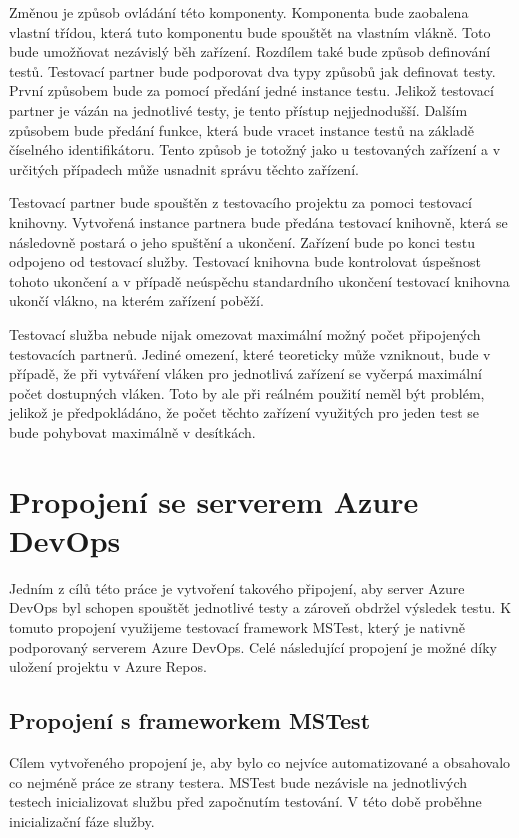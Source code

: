 Změnou je způsob ovládání této komponenty. Komponenta bude zaobalena vlastní třídou, která tuto komponentu bude spouštět na vlastním vlákně. Toto bude umožňovat nezávislý běh zařízení. Rozdílem také bude způsob definování testů. Testovací partner bude podporovat dva typy způsobů jak definovat testy. První způsobem bude za pomocí předání jedné instance testu. Jelikož testovací partner je vázán na jednotlivé testy, je tento přístup nejjednodušší. Dalším způsobem bude předání funkce, která bude vracet instance testů na základě číselného identifikátoru. Tento způsob je totožný jako u testovaných zařízení a v určitých případech může usnadnit správu těchto zařízení. 

Testovací partner bude spouštěn z testovacího projektu za pomoci testovací knihovny. Vytvořená instance partnera bude předána testovací knihovně, která se následovně postará o jeho spuštění a ukončení. Zařízení bude po konci testu odpojeno od testovací služby. Testovací knihovna bude kontrolovat úspešnost tohoto ukončení a v případě neúspěchu standardního ukončení testovací knihovna ukončí vlákno, na kterém zařízení poběží.

Testovací služba nebude nijak omezovat maximální možný počet připojených testovacích partnerů. Jediné omezení, které teoreticky může vzniknout, bude v případě, že při vytváření vláken pro jednotlivá zařízení se vyčerpá maximální počet dostupných vláken. Toto by ale při reálném použití neměl být problém, jelikož je předpokládáno, že počet těchto zařízení využitých pro jeden test se bude pohybovat maximálně v desítkách. 


\section{Propojení se serverem Azure DevOps}

Jedním z cílů této práce je vytvoření takového připojení, aby server Azure DevOps byl schopen spouštět jednotlivé testy a zároveň obdržel výsledek testu. K tomuto propojení využijeme testovací framework MSTest, který je nativně podporovaný serverem Azure DevOps. Celé následující propojení je možné díky uložení projektu v Azure Repos.

\subsection{Propojení s frameworkem MSTest}
Cílem vytvořeného propojení je, aby bylo co nejvíce automatizované a obsahovalo co nejméně práce ze strany testera. MSTest bude nezávisle na jednotlivých testech inicializovat službu před započnutím testování. V této době proběhne inicializační fáze služby. 

